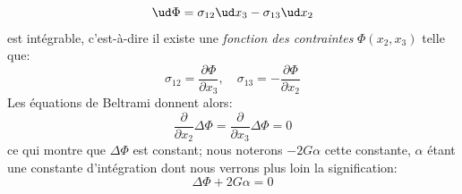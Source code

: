\begin{equation}
    \ud \Phi = \sigma_{12} \ud x_3 - \sigma_{13} \ud x_2
    \label{eq:Ch07-051}
\end{equation}
est intégrable, c'est-à-dire il existe une \emph{fonction des contraintes} $\Phi\left( x_2, x_3 \right)$ telle que:
\begin{equation}
    \sigma_{12} = \frac{\partial \Phi}{\partial x_3} , \quad \sigma_{13} = - \frac{\partial \Phi}{\partial x_2}
    \label{eq:Ch07-052}
\end{equation}
Les équations de Beltrami donnent alors:
\begin{equation}
    \frac{\partial}{\partial x_2} \Delta \Phi = \frac{\partial}{\partial x_3} \Delta \Phi = 0
    \label{eq:Ch07-053}
\end{equation}
ce qui montre que $\Delta \Phi$ est constant; nous noterons $-2G\alpha$ cette constante, $\alpha$ étant une constante d'intégration dont nous verrons plus loin la signification:
\begin{equation}
    \Delta \Phi + 2 G \alpha = 0
    \label{eq:Ch07-054}
\end{equation}

